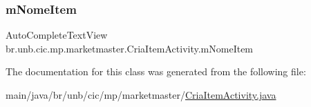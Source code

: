 \subsubsection{\texorpdfstring{m\+Nome\+Item}{mNomeItem}}
{\footnotesize\ttfamily Auto\+Complete\+Text\+View br.\+unb.\+cic.\+mp.\+marketmaster.\+Cria\+Item\+Activity.\+m\+Nome\+Item\hspace{0.3cm}{\ttfamily [package]}}



The documentation for this class was generated from the following file\+:\begin{DoxyCompactItemize}
\item 
main/java/br/unb/cic/mp/marketmaster/\mbox{\hyperlink{CriaItemActivity_8java}{Cria\+Item\+Activity.\+java}}\end{DoxyCompactItemize}
